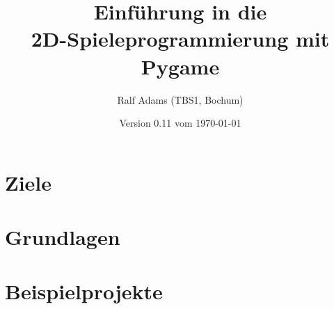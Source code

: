 \documentclass[a4paper,12pt,twoside]{scrreprt}
\begin{document}
  \title{Einführung in die\\2D-Spieleprogrammierung mit Pygame}
  \author{Ralf Adams (TBS1, Bochum)}
  \date{Version 0.11 vom \today}
  \maketitle
  \tableofcontents

\setlength{\parindent}{0.0em}
\setlength{\parskip}{1.0ex plus0.5ex minus0.5ex}
\setlength{\itemsep}{-0.3ex plus0.2ex}


\chapter{Ziele}
\chapter{Grundlagen}\label{secGrundlagen}















\chapter{Beispielprojekte}



\listoffigures

\printglossaries
\printindex
{}
\end{document}
